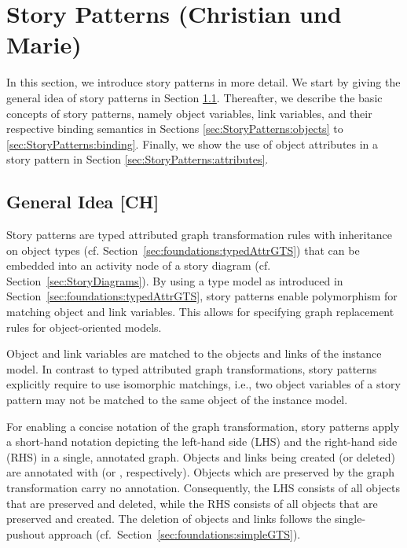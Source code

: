 \section{Story Patterns (Christian und Marie)} \label{sec:StoryPatterns}

In this section, we introduce story patterns in more detail.
We start by giving the general idea of story patterns in Section \ref{sec:StoryPatterns:storyPattern}.
Thereafter, we describe the basic concepts of story patterns, namely object variables, link variables,
and their respective binding semantics in Sections \ref{sec:StoryPatterns:objects} to \ref{sec:StoryPatterns:binding}.
Finally, we show the use of object attributes in a story pattern in Section \ref{sec:StoryPatterns:attributes}.


\subsection{General Idea [CH]}
\label{sec:StoryPatterns:storyPattern}

Story patterns are typed attributed graph transformation rules with inheritance on object types (cf. Section~\ref{sec:foundations:typedAttrGTS}) that can be embedded into an activity node of a story diagram (cf. Section~\ref{sec:StoryDiagrams}).
 By using a type model as introduced in Section~\ref{sec:foundations:typedAttrGTS}, story patterns enable polymorphism for matching object and link variables.
This allows for specifying graph replacement rules for object-oriented models.

Object and link variables are matched to the objects and links of the instance model. 
In contrast to typed attributed graph transformations, story patterns explicitly require to use isomorphic matchings, i.e., two object variables of a story pattern may not be matched to the same object of the instance model.

For enabling a concise notation of the graph transformation, story patterns apply a short-hand notation depicting the left-hand side (LHS) and the right-hand side (RHS) in a single, annotated graph. 
Objects and links being created (or deleted) are annotated with \create (or  \destroy, respectively). 
Objects which are preserved by the graph transformation carry no annotation.
Consequently, the LHS consists of all objects that are preserved and deleted, while the RHS consists of all objects that are preserved and created. 
The deletion of objects and links follows the single-pushout approach (cf.\ Section~\ref{sec:foundations:simpleGTS}).

